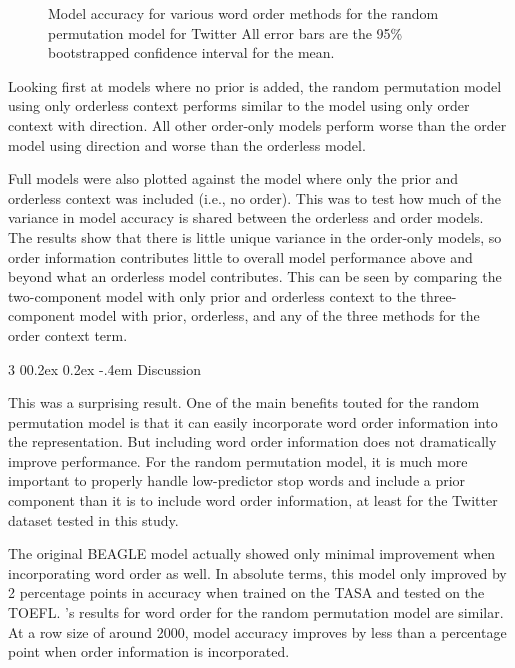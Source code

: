 \documentclass[man,floatsintext,donotrepeattitle]{apa6}
\makeatletter
\renewcommand{\subsubsection}{%
  \@startsection
  {subsubsection}%
  {3}%
  {\parindent}%
  {0\baselineskip \@plus 0.2ex \@minus 0.2ex}%
  {-.4em}%
  {\normalfont\normalsize\bfseries\addperi}}
\makeatother
\begin{document}
\begin{figure}[!htbp]
  \caption{
    Model accuracy for various word order methods for the random permutation model for Twitter
    All error bars are the 95\% bootstrapped confidence interval for the mean. 
  }
  \label{figContextOrder}
\end{figure}

Looking first at models where no prior is added, the random permutation model using only orderless context performs similar to the model using only order context with direction.
All other order-only models perform worse than the order model using direction and worse than the orderless model.

Full models were also plotted against the model where only the prior and orderless context was included (i.e., no order).
This was to test how much of the variance in model accuracy is shared between the orderless and order models.
The results show that there is little unique variance in the order-only models, so order information contributes little to overall model performance above and beyond what an orderless model contributes.
This can be seen by comparing the two-component model with only prior and orderless context to the three-component model with prior, orderless, and any of the three methods for the order context term.

\subsubsection{Discussion}

This was a surprising result.
One of the main benefits touted for the random permutation model is that it can easily incorporate word order information into the representation.
But including word order information does not dramatically improve performance. 
For the random permutation model, it is much more important to properly handle low-predictor stop words and include a prior component than it is to include word order information,
at least for the Twitter dataset tested in this study.

The original BEAGLE model \parencite{Jones2007} actually showed only minimal improvement when incorporating word order as well.
In absolute terms, this model only improved by 2 percentage points in accuracy when trained on the TASA and tested on the TOEFL.
\textcite{Sahlgren2008}'s results for word order for the random permutation model are similar.
At a row size of around \num{2000}, model accuracy improves by less than a percentage point when order information is incorporated.
\end{document}

